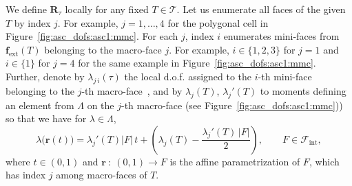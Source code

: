 \documentclass[12pt]{article}
\newcommand{\vect}[1]{\boldsymbol{\mathbf{#1}}}
\newcommand{\bmesh}{{\vect{\mathcal T}}}
\newcommand{\mmesh}{{\vect{\mathcal \tau}}}
\newcommand{\bfaces}[1][]{{\vect{\mathcal F}_{\text{#1}}}}
\newcommand{\mfaces}[1][]{{\vect{ f}_{\text{#1}}}}
\begin{document}
We  define $\vect R_\mmesh$ locally for any fixed $T\in\bmesh$. Let us enumerate all faces of the given $T$ by index $j$. For example, $j=1,\dots,4$ for the polygonal cell in Figure~\ref{fig:asc_dofs:asc1:mmc}. For each $j$, index $i$ enumerates mini-faces from $\mfaces[ext](T)$ belonging to the macro-face $j$. For example, $i\in\{1,2,3\}$ for $j=1$ and $i\in\{1\}$ for $j=4$ for the same example in Figure~\ref{fig:asc_dofs:asc1:mmc}.
Further,  denote by $\lambda_{j\,i}(\mmesh)$ the local d.o.f. assigned  to the $i$-th mini-face~ belonging to the $j$-th macro-face~, and by $\lambda_{j}(T)$, $\lambda_{j}'(T)$ to moments defining an element from $\Lambda$ on the $j$-th macro-face (see Figure~\ref{fig:asc_dofs:asc1:mmc})) so that
we have for $\lambda\in\Lambda$,
	\begin{equation}\label{lambda_intermsof_moments}
		{\lambda}\big({\vect r}(t)\big) = \lambda_{j}'(T)|F|\,t + \left( \lambda_{j}(T) - \frac{\lambda_{j}'(T)\,|F|}{2} \right),\qquad  F\in\bfaces[int],
	\end{equation}
where $t\in(0,1)$ and ${\vect r}\::\:\left(0,1\right) \rightarrow F$ is the affine parametrization of $F$, which has index $j$ among macro-faces of $T$.
\end{document}
